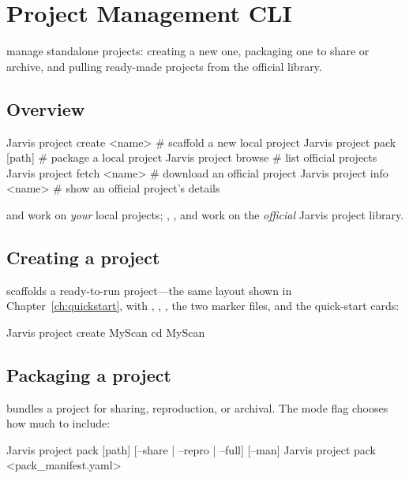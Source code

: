 \chapter{Project Management CLI}
\label{ch:project-cli}

 manage standalone projects: creating a new one,
packaging one to share or archive, and pulling ready-made projects from the official library.

\section{Overview}
\label{sec:proj-overview}

\begin{shellbox}
Jarvis project create <name>     # scaffold a new local project
Jarvis project pack [path]       # package a local project
Jarvis project browse            # list official projects
Jarvis project fetch <name>      # download an official project
Jarvis project info <name>       # show an official project's details
\end{shellbox}

\noindent {} and  work on \emph{your} local projects; ,
, and  work on the \emph{official} Jarvis project library.

\section{Creating a project}
\label{sec:proj-create}

 scaffolds a ready-to-run project---the same layout shown in
Chapter~\ref{ch:quickstart}, with , , , the two marker files,
and the quick-start cards:

\begin{shellbox}
Jarvis project create MyScan
cd MyScan
\end{shellbox}

\section{Packaging a project}
\label{sec:proj-pack}

 bundles a project for sharing, reproduction, or archival. The mode flag chooses how
much to include:

\begin{shellbox}
Jarvis project pack [path] [--share | --repro | --full] [--man]
Jarvis project pack <pack_manifest.yaml>
\end{shellbox}

